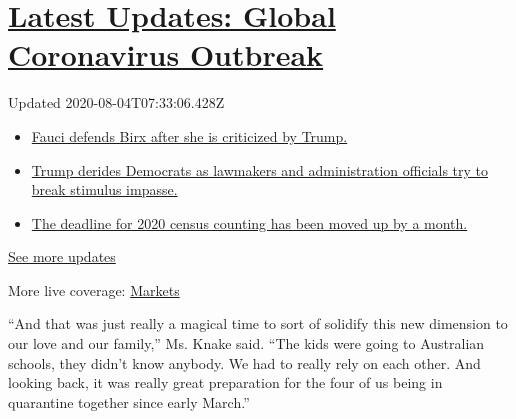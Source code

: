 \hypertarget{latest-updates-global-coronavirus-outbreak}{%
\section{\texorpdfstring{\href{https://www.nytimes.com/2020/08/03/world/coronavirus-covid-19.html?action=click\&pgtype=Article\&state=default\&region=MAIN_CONTENT_1\&context=storylines_live_updates}{Latest
Updates: Global Coronavirus
Outbreak}}{Latest Updates: Global Coronavirus Outbreak}}\label{latest-updates-global-coronavirus-outbreak}}

Updated 2020-08-04T07:33:06.428Z

\begin{itemize}
\tightlist
\item
  \href{https://www.nytimes.com/2020/08/03/world/coronavirus-covid-19.html?action=click\&pgtype=Article\&state=default\&region=MAIN_CONTENT_1\&context=storylines_live_updates\#link-4547638f}{Fauci
  defends Birx after she is criticized by Trump.}
\item
  \href{https://www.nytimes.com/2020/08/03/world/coronavirus-covid-19.html?action=click\&pgtype=Article\&state=default\&region=MAIN_CONTENT_1\&context=storylines_live_updates\#link-15e7f995}{Trump
  derides Democrats as lawmakers and administration officials try to
  break stimulus impasse.}
\item
  \href{https://www.nytimes.com/2020/08/03/world/coronavirus-covid-19.html?action=click\&pgtype=Article\&state=default\&region=MAIN_CONTENT_1\&context=storylines_live_updates\#link-e5a2cda}{The
  deadline for 2020 census counting has been moved up by a month.}
\end{itemize}

\href{https://www.nytimes.com/2020/08/03/world/coronavirus-covid-19.html?action=click\&pgtype=Article\&state=default\&region=MAIN_CONTENT_1\&context=storylines_live_updates}{See
more updates}

More live coverage:
\href{https://www.nytimes.com/live/2020/08/03/business/stock-market-today-coronavirus?action=click\&pgtype=Article\&state=default\&region=MAIN_CONTENT_1\&context=storylines_live_updates}{Markets}

``And that was just really a magical time to sort of solidify this new
dimension to our love and our family,'' Ms. Knake said. ``The kids were
going to Australian schools, they didn't know anybody. We had to really
rely on each other. And looking back, it was really great preparation
for the four of us being in quarantine together since early March.''

